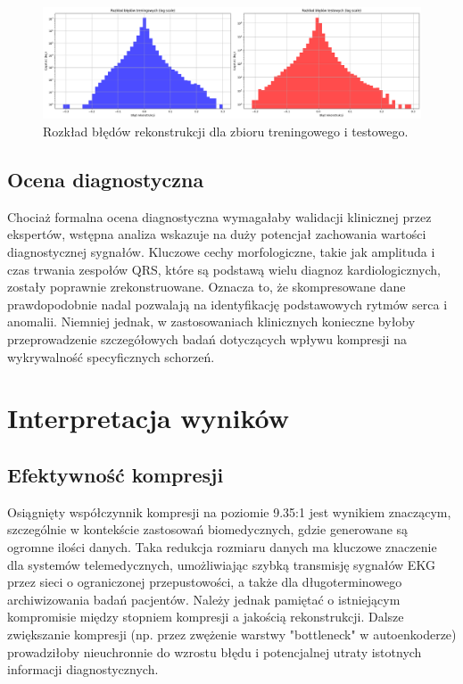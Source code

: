 \documentclass[12pt,a4paper]{article}
\begin{document}
\begin{figure}[H]
    \centering
    \includegraphics[width=\textwidth]{error_distribution.png}
    \caption{Rozkład błędów rekonstrukcji dla zbioru treningowego i testowego.}
    \label{fig:error_distribution}
\end{figure}

\subsection{Ocena diagnostyczna}

Chociaż formalna ocena diagnostyczna wymagałaby walidacji klinicznej przez ekspertów, wstępna analiza wskazuje na duży potencjał zachowania wartości diagnostycznej sygnałów. Kluczowe cechy morfologiczne, takie jak amplituda i czas trwania zespołów QRS, które są podstawą wielu diagnoz kardiologicznych, zostały poprawnie zrekonstruowane. Oznacza to, że skompresowane dane prawdopodobnie nadal pozwalają na identyfikację podstawowych rytmów serca i anomalii. Niemniej jednak, w zastosowaniach klinicznych konieczne byłoby przeprowadzenie szczegółowych badań dotyczących wpływu kompresji na wykrywalność specyficznych schorzeń.

\section{Interpretacja wyników}

\subsection{Efektywność kompresji}

Osiągnięty współczynnik kompresji na poziomie 9.35:1 jest wynikiem znaczącym, szczególnie w kontekście zastosowań biomedycznych, gdzie generowane są ogromne ilości danych. Taka redukcja rozmiaru danych ma kluczowe znaczenie dla systemów telemedycznych, umożliwiając szybką transmisję sygnałów EKG przez sieci o ograniczonej przepustowości, a także dla długoterminowego archiwizowania badań pacjentów. Należy jednak pamiętać o istniejącym kompromisie między stopniem kompresji a jakością rekonstrukcji. Dalsze zwiększanie kompresji (np. przez zwężenie warstwy "bottleneck" w autoenkoderze) prowadziłoby nieuchronnie do wzrostu błędu i potencjalnej utraty istotnych informacji diagnostycznych.
\end{document}
